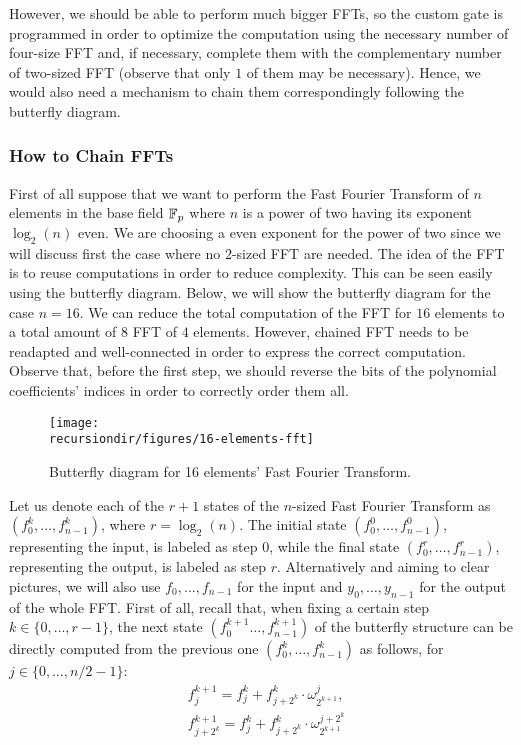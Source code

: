 However, we should be able to perform much bigger FFTs, so the custom gate is programmed in order to optimize the computation using the necessary number of four-size FFT and, if necessary, complete them with the complementary number of two-sized FFT (observe that only $1$ of them may be necessary). Hence, we would also need a mechanism to chain them correspondingly following the butterfly diagram. 




\subsubsection{How to Chain FFTs}

First of all suppose that we want to perform the Fast Fourier Transform of $n$ elements in the base field $\mathbb{F}_p$ where $n$ is a power of two having its exponent $\log_2(n)$ even. We are choosing a even exponent for the power of two since we will discuss first the case where no $2$-sized FFT are needed. The idea of the FFT is to reuse computations in order to reduce complexity. This can be seen easily using the butterfly diagram. Below, we will show the butterfly diagram for the case $n = 16$. We can reduce the total computation of the FFT for $16$ elements to a total amount of $8$ FFT of $4$ elements. However, chained FFT needs to be readapted and well-connected in order to express the correct computation. Observe that, before the first step, we should reverse the bits of the polynomial coefficients' indices in order to correctly order them all.


\begin{figure}[H]
\centering
\texttt{[image: \\recursiondir/figures/16-elements-fft]}
\caption{Butterfly diagram for 16 elements' Fast Fourier Transform.}
\label{fig:c12a-proof}
\end{figure}

Let us denote each of the $r + 1$ states of the $n$-sized Fast Fourier Transform as $(f_0^k, \dots, f_{n-1}^k)$, where $r = \log_2(n)$. The initial state $(f_0^0, \dots, f_{n-1}^0)$, representing the input, is labeled as step $0$, while the final state $(f_0^r, \dots, f_{n-1}^r)$, representing the output, is labeled as step $r$. Alternatively and aiming to clear pictures, we will also use $f_0, \dots, f_{n-1}$ for the input and $y_0, \dots, y_{n-1}$ for the output of the whole FFT. First of all, recall that, when fixing a certain step $k \in \{0, \dots, r - 1\}$, the next state $(f_0^{k+1} \dots, f_{n-1}^{k+1})$ of the butterfly structure can be directly computed from the previous one $(f_0^{k}, \dots, f_{n-1}^{k})$ as follows, for $j \in \{0, \dots, n/2 - 1\}$:
\begin{align*}
&f_j^{k+1} = f_j^k + f_{j + 2^k}^{k} \cdot \omega_{2^{k+1}}^j,                                           \\
&f_{j + 2^k}^{k+1} = f_j^k + f_{j + 2^k}^{k} \cdot \omega_{2^{k+1}}^{j + 2^k}
\end{align*}

